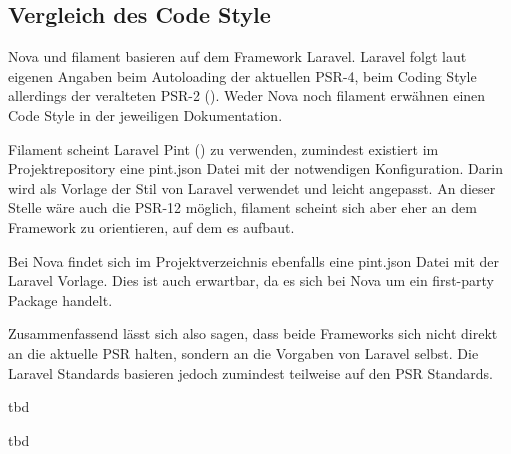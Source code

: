 \subsection{Vergleich des Code Style}
Nova und filament basieren auf dem Framework Laravel.
Laravel folgt laut eigenen Angaben beim Autoloading der aktuellen PSR-4, beim Coding Style allerdings der veralteten PSR-2 (\cite{laravel-docs-coding-style}).
Weder Nova noch filament erwähnen einen Code Style in der jeweiligen Dokumentation.

Filament scheint Laravel Pint (\cite{laravel-docs-pint}) zu verwenden, zumindest existiert im Projektrepository eine pint.json Datei mit der notwendigen Konfiguration.
Darin wird als Vorlage der Stil von Laravel verwendet und leicht angepasst.
An dieser Stelle wäre auch die PSR-12 möglich, filament scheint sich aber eher an dem Framework zu orientieren, auf dem es aufbaut.

Bei Nova findet sich im Projektverzeichnis ebenfalls eine pint.json Datei mit der Laravel Vorlage.
Dies ist auch erwartbar, da es sich bei Nova um ein first-party Package handelt.

Zusammenfassend lässt sich also sagen, dass beide Frameworks sich nicht direkt an die aktuelle PSR halten, sondern an die Vorgaben von Laravel selbst.
Die Laravel Standards basieren jedoch zumindest teilweise auf den PSR Standards.

\color{red}
tbd
\color{black}

\color{red}
tbd
\color{black}
